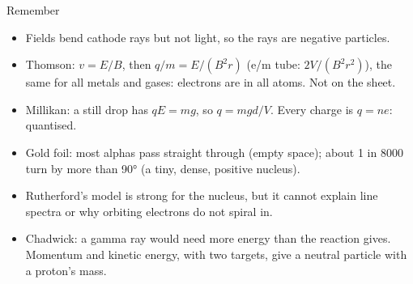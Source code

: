 \begin{summarybox}{Remember}
\begin{itemize}
  \item Fields bend cathode rays but not light, so the rays are negative particles.
  \item Thomson: $v = E/B$, then $q/m = E/(B^2 r)$ (e/m tube: $2V/(B^2 r^2)$), the same for all
        metals and gases: electrons are in all atoms. Not on the sheet.
  \item Millikan: a still drop has $qE = mg$, so $q = mgd/V$. Every charge is $q = ne$: quantised.
  \item Gold foil: most alphas pass straight through (empty space); about 1 in 8000 turn by more
        than \ang{90} (a tiny, dense, positive nucleus).
  \item Rutherford's model is strong for the nucleus, but it cannot explain line spectra or why
        orbiting electrons do not spiral in.
  \item Chadwick: a gamma ray would need more energy than the reaction gives. Momentum and
        kinetic energy, with two targets, give a neutral particle with a proton's mass.
\end{itemize}
\end{summarybox}
